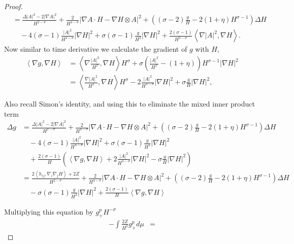 \begin{proof}
\begin{align*}
        & = \frac{\Delta |A|^{2}- 2|\nabla A|^{2}}{H^{2-\sigma}} + \frac{2}{H^{4-\sigma}}| \nabla A \cdot H - \nabla H \otimes A|^{2} + \left( (\sigma-2)\frac{g}{H} - 2(1+\eta)H^{\sigma-1} \right)\Delta H \\
        & \quad - 4(\sigma -1) \frac{|A|^{2}}{H^{4-\sigma}} |\nabla H|^{2} + \sigma(\sigma -1)\frac{g}{H^{2}}|\nabla H|^{2}+ \frac{2(\sigma -1)}{H^{3-\sigma}} \left< \nabla |A|^{2}, \nabla H \right>.
    \end{align*}
    Now similar to time derivative we calculate the gradient of $ g $ with $ H $, \begin{align*}
        \left< \nabla g, \nabla H \right> & = \left< \nabla\frac{ |A|^{2}}{H^{2}}, \nabla H \right>H^{\sigma} + \sigma\left( \frac{|A|^{2}}{H^{2}} - (1+ \eta) \right) H^{\sigma-1}| \nabla H|^{2} \\
        & = \left< \frac{\nabla |A|^{2}}{H^{2}}, \nabla H \right>H^{\sigma} -2 \frac{|A|^{2}}{H^{3-\sigma}}|\nabla H|^{2}+ \sigma \frac{g}{H}| \nabla H|^{2},
    \end{align*}

    Also recall Simon's identity, and using this to eliminate the mixed inner product term 
    \begin{align*}
        \Delta g & = \frac{\Delta |A|^{2}- 2|\nabla A|^{2}}{H^{2-\sigma}} + \frac{2}{H^{4-\sigma}}| \nabla A \cdot H - \nabla H \otimes A|^{2} + \left( (\sigma-2)\frac{g}{H} - 2(1+\eta)H^{\sigma-1} \right)\Delta H \\
        & \quad - 4(\sigma -1) \frac{|A|^{2}}{H^{4-\sigma}} |\nabla H|^{2} + \sigma(\sigma -1)\frac{g}{H^{2}}|\nabla H|^{2} \\
        & \quad + \frac{2(\sigma -1)}{H}\left( \left< \nabla g, \nabla H \right> +2 \frac{|A|^{2}}{H^{3-\sigma}}|\nabla H|^{2} - \sigma \frac{g}{H}|\nabla H|^{2} \right)  \\
        & = \frac{2\left< h_{ij}, \nabla_{i}\nabla_{j}H \right>+2Z}{H^{2-\sigma}} + \frac{2}{H^{4-\sigma}}| \nabla A \cdot H - \nabla H \otimes A|^{2} + \left( (\sigma-2)\frac{g}{H} - 2(1+\eta)H^{\sigma-1} \right)\Delta H \\
        & \quad - \sigma(\sigma-1) \frac{g}{H^{2}}|\nabla H|^{2} + \frac{2(\sigma -1)}{H}\left< \nabla g, \nabla H \right>
    \end{align*}

    Multiplying this equation by $ g_{+}^{p}H^{-\sigma} $ \begin{align*}
        - \int \frac{2Z}{H^{2}}g_{+}^{p} d \mu & = 
    \end{align*}
    \end{proof}

